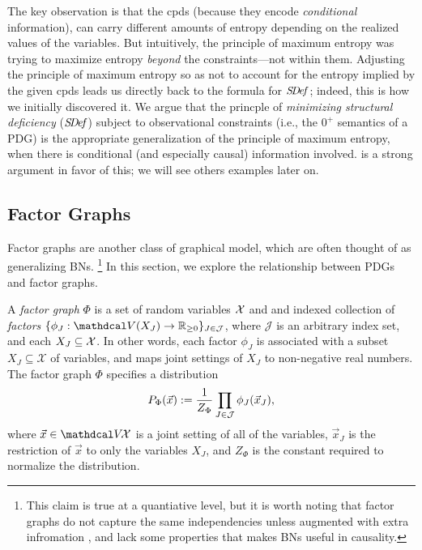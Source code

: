 The key observation is that the cpds
    (because they encode \emph{conditional} information), 
can carry different amounts of entropy depending on the realized values of the variables. 
But intuitively, the principle of maximum entropy was trying to maximize entropy \emph{beyond} the constraints---not within them. 
Adjusting the principle of maximum entropy so as not to account for the entropy implied by the given cpds leads us directly back to the formula for $\SDef$; indeed, this is how we initially discovered it.
%
We argue that the princple of \emph{minimizing structural deficiency} ($\SDef$) subject to observational constraints (i.e., the $0^+$ semantics of a PDG) is the appropriate generalization of the principle of maximum entropy, when there is conditional (and especially causal) information involved. 
%
 is a strong argument in favor of this;
    we will see others examples later on.


\subsection{Factor Graphs} 
    \label{sec:factor-graphs}
Factor graphs 
\citep{kschischang2001sumproduct}
are another class of graphical model, which are often thought of as generalizing BNs.%
    \footnote{This claim is true at a quantiative level, but it is worth noting that factor graphs do not capture the same independencies unless augmented with extra infromation \citep{frey2012extending}, and lack some properties that makes BNs useful in causality.}
In this section, we explore the relationship between PDGs and factor graphs.

\begin{defn}
 A \emph{factor graph} $\Phi$ is a set of random variables
        $\X$ and
    and indexed collection of \emph{factors}
       $\{\phi_J : \V(X_J) \to \mathbb R_{\geq0}\}_{J \in
\mathcal J }$,
where $\mathcal J$ is an arbitrary index set, 
and each $X_J \subseteq \X$.  
In other words, each factor $\phi_J$ is associated with a subset
$X_J\subseteq \mathcal{X}$ of variables, and maps
joint settings of $X_J$ to non-negative real numbers.
The factor graph $\Phi$ specifies a distribution
\[ {\Pr}_{\Phi}(\vec x) := \frac{1}{Z_{\Phi}}
 	\prod_{J \in \cal J} \phi_J(\vec x_J), \]
where $\vec{x} \in \V\!\X$ is a joint setting of all of the variables,
 $\vec{x}_J$ is the restriction of $\vec{x}$ to only the
 variables $X_J$, and $Z_{\Phi}$ is the constant required to
 normalize the distribution.  
\end{defn}

